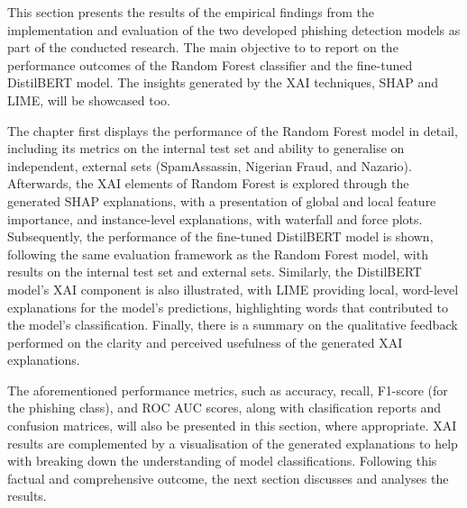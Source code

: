 
This section presents the results of the empirical findings from the implementation and evaluation of the two developed phishing detection models as part of the conducted research. The main objective to to report on the performance outcomes of the Random Forest classifier and the fine-tuned DistilBERT model. The insights generated by the XAI techniques, SHAP and LIME, will be showcased too.\newline

\noindent The chapter first displays the performance of the Random Forest model in detail, including its metrics on the internal test set and ability to generalise on independent, external sets (SpamAssassin, Nigerian Fraud, and Nazario). Afterwards, the XAI elements of Random Forest is explored through the generated SHAP explanations, with a presentation of global and local feature importance, and instance-level explanations, with waterfall and force plots. Subsequently, the performance of the fine-tuned DistilBERT model is shown, following the same evaluation framework as the Random Forest model, with results on the internal test set and external sets. Similarly, the DistilBERT model's XAI component is also illustrated, with LIME providing local, word-level explanations for the model's predictions, highlighting words that contributed to the model's classification. Finally, there is a summary on the qualitative feedback performed on the clarity and perceived usefulness of the generated XAI explanations.\newline

\noindent The aforementioned performance metrics, such as accuracy, recall, F1-score (for the phishing class), and ROC AUC scores, along with clasification reports and confusion matrices, will also be presented in this section, where appropriate. XAI results are complemented by a visualisation of the generated explanations to help with breaking down the understanding of model classifications. Following this factual and comprehensive outcome, the next section discusses and analyses the results.
